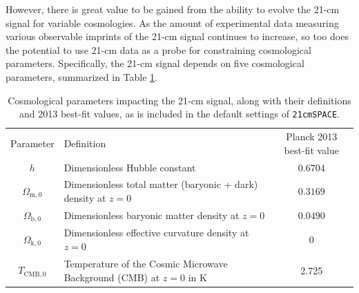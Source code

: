 \documentclass[floats,floatfix,showpacs,amssymb,prd,superscriptaddress,nofootinbib]{revtex4-2} %
\newcommand{\code}{\texttt}
\begin{document}
However, there is great value to be gained from the ability to evolve the 21-cm signal for variable cosmologies. As the amount of experimental data measuring various observable imprints of the 21-cm signal continues to increase, so too does the potential to use 21-cm data as a probe for constraining cosmological parameters. Specifically, the 21-cm signal depends on five cosmological parameters, summarized in Table \ref{tab:cosmological_parameters}.


\begin{table}[H]
    \centering
    \begin{tabular}{c l c}
        \hline
        Parameter & Definition & Planck 2013 best-fit value\\ \hhline{===}
        $h$ & Dimensionless Hubble constant & $0.6704$\\
        $\Omega_{\text{m}, 0}$ & Dimensionless total matter (baryonic + dark) density at $z = 0$ & $0.3169$\\
        $\Omega_{\text{b}, 0}$ & Dimensionless baryonic matter density at $z = 0$ & $0.0490$\\
        $\Omega_{\text{k}, 0}$ & Dimensionless effective curvature density at $z = 0$ & $0$\\
        $T_{\text{CMB},0}$ & Temperature of the Cosmic Microwave Background (CMB) at $z = 0$ in K & 2.725\\ \hline
    \end{tabular}
    \caption{Cosmological parameters impacting the 21-cm signal, along with their definitions and 2013 best-fit values, as is included in the default settings of \code{21cmSPACE}.}
    \label{tab:cosmological_parameters}
\end{table}


\end{document}
